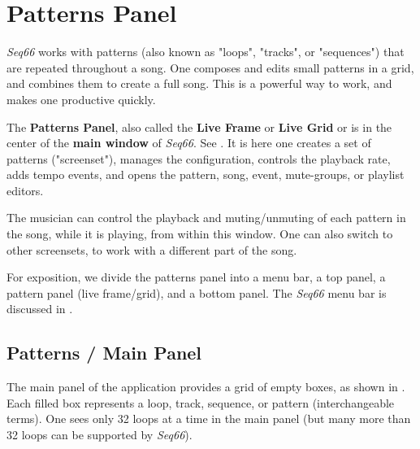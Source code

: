 %
%
%

\section{Patterns Panel}
\label{sec:patterns_panel}

   \textsl{Seq66} works with patterns (also known as "loops", "tracks", or
   "sequences") that are repeated throughout a song.
   One composes and edits small patterns in a grid,
   and combines them to create a full song.
   This is a powerful way to work, and makes one productive quickly.

   The \textbf{Patterns Panel}, also called the
   \textbf{Live Frame} or
   \textbf{Live Grid} or
   is in the center of the
   \textbf{main window} of \textsl{Seq66}.
   See .
   It is here one creates a set of patterns ("screenset"),
   manages the configuration, controls the playback rate, adds tempo events,
   and opens the pattern, song, event, mute-groups, or playlist editors.

   The musician can
   control the playback and muting/unmuting of each pattern in
   the song, while it is playing, from within this window.
   One can also switch to other screensets, to work with a different
   part of the song.

   For exposition, we divide the patterns panel
   into a menu bar, a top panel, a pattern panel (live frame/grid),
   and a bottom panel.
   The \textsl{Seq66} menu bar is discussed in .

\subsection{Patterns / Main Panel}
\label{subsec:patterns_panel_main}

   The main panel of the application provides a grid of empty boxes,
   as shown in
   .
   Each filled box represents a loop, track, sequence, or pattern
   (interchangeable terms).
   One sees only 32 loops at a time in the main panel (but many more than
   32 loops can be supported by \textsl{Seq66}).

